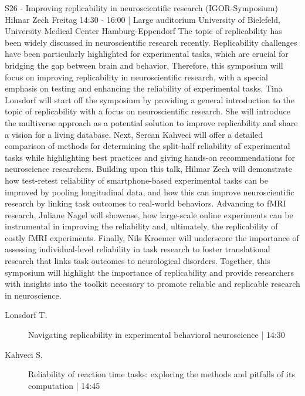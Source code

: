 
            \begin{symposium}
            {S26 - Improving replicability in neuroscientific research (IGOR-Symposium)}
            {Hilmar Zech}
            {Freitag 14:30 - 16:00 | Large auditorium}
            {University of Bielefeld, University Medical Center Hamburg-Eppendorf}
            The topic of replicability has been widely discussed in neuroscientific research recently. Replicability challenges have been particularly highlighted for experimental tasks, which are crucial for bridging the gap between brain and behavior. Therefore, this symposium will focus on improving replicability in neuroscientific research, with a special emphasis on testing and enhancing the reliability of experimental tasks. Tina Lonsdorf will start off the symposium by providing a general introduction to the topic of replicability with a focus on neuroscientific research. She will introduce the multiverse approach as a potential solution to improve replicability and share a vision for a living database. Next, Sercan Kahveci will offer a detailed comparison of methods for determining the split-half reliability of experimental tasks while highlighting best practices and giving hands-on recommendations for neuroscience researchers. Building upon this talk, Hilmar Zech will demonstrate how test-retest reliability of smartphone-based experimental tasks can be improved by pooling longitudinal data, and how this can improve neuroscientific research by linking task outcomes to real-world behaviors. Advancing to fMRI research, Juliane Nagel will showcase, how large-scale online experiments can be instrumental in improving the reliability and, ultimately, the replicability of costly fMRI experiments. Finally, Nils Kroemer will underscore the importance of assessing individual-level reliability in task research to foster translational research that links task outcomes to neurological disorders. Together, this symposium will highlight the importance of replicability and provide researchers with insights into the toolkit necessary to promote reliable and replicable research in neuroscience.
            \begin{description}    
            
                \item [ Lonsdorf T.] Navigating replicability in experimental behavioral neuroscience \textcolor{mygray}{ | 14:30}    
                
                \item [ Kahveci S.] Reliability of reaction time tasks: exploring the methods and pitfalls of its computation \textcolor{mygray}{ | 14:45}    
                

\end{description}
\end{symposium}
